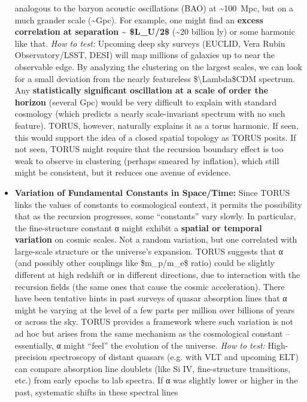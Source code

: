 \documentclass[]{article}
\begin{document}
\begin{itemize}
  analogous to the baryon acoustic oscillations (BAO) at
  \textasciitilde{}100~Mpc, but on a much grander scale
  (\textasciitilde{}Gpc). For example, one might find an \textbf{excess
  correlation at separation \textasciitilde{} \$L\_U/2\$}
  (\textasciitilde{}20 billion ly) or some harmonic like that​.
  \emph{How to test:} Upcoming deep sky surveys (EUCLID, Vera Rubin
  Observatory/LSST, DESI) will map millions of galaxies up to near the
  observable edge. By analyzing the clustering on the largest scales, we
  can look for a small deviation from the nearly featureless
  \$\textbackslash{}Lambda\$CDM spectrum. Any \textbf{statistically
  significant oscillation at a scale of order the horizon} (several Gpc)
  would be very difficult to explain with standard cosmology (which
  predicts a nearly scale-invariant spectrum with no such feature)​.
  TORUS, however, naturally explains it as a torus harmonic. If seen,
  this would support the idea of a closed spatial topology as TORUS
  posits. If not seen, TORUS might require that the recursion boundary
  effect is too weak to observe in clustering (perhaps smeared by
  inflation), which still might be consistent, but it reduces one avenue
  of evidence.
\item
  \textbf{Variation of Fundamental Constants in Space/Time:} Since TORUS
  links the values of constants to cosmological context, it permits the
  possibility that as the recursion progresses, some ``constants'' vary
  slowly. In particular, the fine-structure constant α might exhibit a
  \textbf{spatial or temporal variation} on cosmic scales​. Not a random
  variation, but one correlated with large-scale structure or the
  universe's expansion. TORUS suggests that α (and possibly other
  couplings like \$m\_p/m\_e\$ ratio) could be slightly different at
  high redshift or in different directions, due to interaction with the
  recursion fields (the same ones that cause the cosmic acceleration)​.
  There have been tentative hints in past surveys of quasar absorption
  lines that α might be varying at the level of a few parts per million
  over billions of years or across the sky. TORUS provides a framework
  where such variation is not ad hoc but arises from the same mechanism
  as the cosmological constant -- essentially, α might ``feel'' the
  evolution of the universe. \emph{How to test:} High-precision
  spectroscopy of distant quasars (e.g. with VLT and upcoming ELT) can
  compare absorption line doublets (like Si IV, fine-structure
  transitions, etc.) from early epochs to lab spectra. If α was slightly
  lower or higher in the past, systematic shifts in these spectral lines

\end{itemize}
\end{document}
